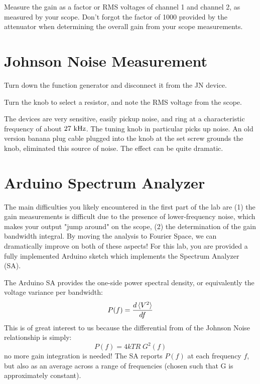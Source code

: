 \documentclass[12pt]{article}
\begin{document}
Measure the gain as a factor or RMS voltages of channel 1 and channel 2, as measured by your scope.  Don't forgot the factor of 1000 provided by the attenuator when determining the overall gain from your scope measurements.

\section{Johnson Noise Measurement}

Turn down the function generator and disconnect it from the JN device.

Turn the knob to select a resistor, and note the RMS voltage from the scope.

The devices are very sensitive, easily pickup noise, and ring at a characteristic frequency of about $27~{\rm kHz}$.  The tuning knob in particular picks up noise.  An old version banana plug cable plugged into the knob at the set screw grounds the knob, eliminated this source of noise.  The effect can be quite dramatic. 

\section{Arduino Spectrum Analyzer}

The main difficulties you likely encountered in the first part of the lab are (1) the gain measurements is difficult due to the presence of lower-frequency noise, which makes your output "jump around" on the scope, (2) the determination of the gain bandwidth integral.  By moving the analysis to Fourier Space, we can dramatically improve on both of these aspects!  For this lab, you are provided a fully implemented Arduino sketch which implements the Spectrum Analyzer (SA).  

The Arduino SA provides the one-side power spectral density, or equivalently the voltage variance per bandwidth:
\begin{displaymath}
P(f) = \frac{d\braket{V^2}}{df}
\end{displaymath}
This is of great interest to us because the differential from of the Johnson Noise relationship is simply:
\begin{equation} \label{eqn:diffnyq}
P(f) = 4 k T R \; G^2(f)
\end{equation}
no more gain integration is needed!  The SA reports $P(f)$ at each frequency $f$, but also as an average across a range of frequencies (chosen such that G is approximately constant).
\end{document}
